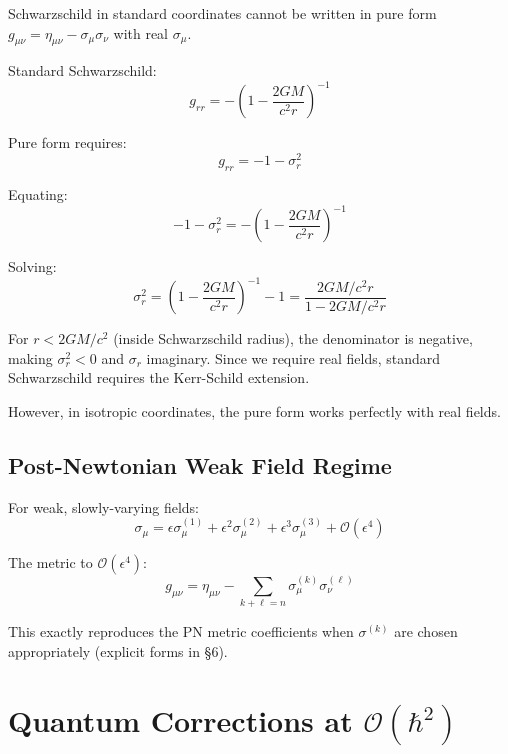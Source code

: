 \documentclass[11pt,a4paper]{article}
\theoremstyle{definition}
\theoremstyle{remark}
\begin{document}
		Schwarzschild in standard coordinates cannot be written in pure form $g_{\mu\nu} = \eta_{\mu\nu} - \sigma_\mu\sigma_\nu$ with real $\sigma_\mu$.

	
		Standard Schwarzschild:
		\begin{equation}
			g_{rr} = -\left(1 - \frac{2GM}{c^2r}\right)^{-1}
		\end{equation}
		
		Pure form requires:
		\begin{equation}
			g_{rr} = -1 - \sigma_r^2
		\end{equation}
		
		Equating:
		\begin{equation}
			-1 - \sigma_r^2 = -\left(1 - \frac{2GM}{c^2r}\right)^{-1}
		\end{equation}
		
		Solving:
		\begin{equation}
			\sigma_r^2 = \left(1 - \frac{2GM}{c^2r}\right)^{-1} - 1 = \frac{2GM/c^2r}{1 - 2GM/c^2r}
		\end{equation}
		
		For $r < 2GM/c^2$ (inside Schwarzschild radius), the denominator is negative, making $\sigma_r^2 < 0$ and $\sigma_r$ imaginary. Since we require real fields, standard Schwarzschild requires the Kerr-Schild extension.
	
	However, in isotropic coordinates, the pure form works perfectly with real fields.
	
	\subsection{Post-Newtonian Weak Field Regime}
	
	For weak, slowly-varying fields:
	\begin{equation}
		\sigma_\mu = \epsilon\sigma_\mu^{(1)} + \epsilon^2\sigma_\mu^{(2)} + \epsilon^3\sigma_\mu^{(3)} + \mathcal{O}(\epsilon^4)
	\end{equation}
	
	The metric to $\mathcal{O}(\epsilon^4)$:
	\begin{equation}
		g_{\mu\nu} = \eta_{\mu\nu} - \sum_{k+\ell=n}\sigma_\mu^{(k)}\sigma_\nu^{(\ell)}
	\end{equation}
	
	This exactly reproduces the PN metric coefficients when $\sigma^{(k)}$ are chosen appropriately (explicit forms in §6).
	
	\section{Quantum Corrections at $\mathcal{O}(\hbar^2)$}
	
\end{document}
